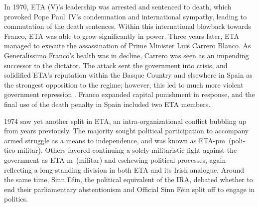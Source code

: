 \documentclass[basque,american]{../../../coursework}
\begin{document}
In 1970, ETA (V)'s leadership was arrested and sentenced to death, which
provoked Pope Paul~IV's condemnation and international sympathy, leading to
commutation of the death sentences. Within this international blowback towards
Franco, ETA was able to grow significantly in power. Three years later, ETA
managed to execute the assassination of Prime Minister Luis Carrero Blanco. As
Generalissimo Franco's health was in decline, Carrero was seen as an impending
successor to the dictator. The attack sent the government into crisis, and
solidified ETA's reputation within the Basque Country and elsewhere in Spain
as the strongest opposition to the regime; however, this led to much more
violent government repression \parencite[44]{Whitfield2014}. Franco expanded
capital punishment in response, and the final use of the death penalty in
Spain included two ETA members.

1974 saw yet another split in ETA, an intra-organizational conflict bubbling
up from years previously. The majority sought political participation to
accompany armed struggle as a means to independence, and was known as
ETA-pm~(\foreignlanguage{basque}{politico-militar}). Others favored continuing
a solely militaristic fight against the government as
ETA-m~(\foreignlanguage{basque}{militar}) and eschewing political processes,
again reflecting a long-standing division in both ETA and its Irish analogue.
Around the same time, Sinn Féin, the political equivalent of the IRA, debated
whether to end their parliamentary abstentionism and Official Sinn Féin split
off to engage in politics.
\end{document}
